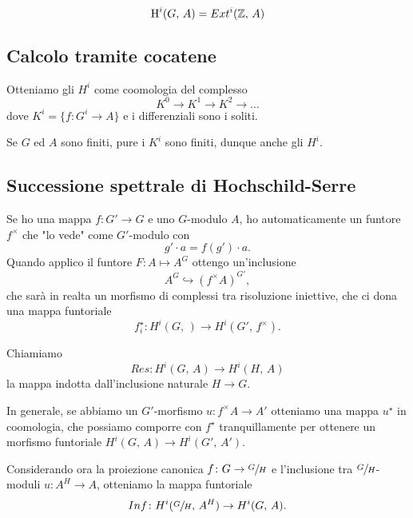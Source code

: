 \documentclass[a4paper]{article}
\begin{document}
	\begin{theorem}
		\[ \operatorname{H}^i(G, \, A) = Ext^i(\mathbb{Z}, \, A) \]
	\end{theorem}

	\subsection{Calcolo tramite cocatene}
	\begin{theorem}
		Otteniamo gli $ H^i $ come coomologia del complesso
		\[ K^0 \to K^1 \to K^2 \to \dots \]
		dove $ K^i = \{ f \colon G^i \to A \} $ e i differenziali sono i soliti.
	\end{theorem}

	\begin{theorem}
		Se $ G $ ed $ A $ sono finiti, pure i $ K^i $ sono finiti, dunque anche gli $ H^i. $
	\end{theorem}
	
	\subsection{Successione spettrale di Hochschild-Serre}
	Se ho una mappa $ f \colon G' \to G $ e uno $ G $-modulo $ A $, ho automaticamente un funtore $ f^\times $ che "lo vede" come $ G' $-modulo con
	\[ g' \cdot a = f(g') \cdot a. \]
	Quando applico il funtore $ F \colon A \mapsto A^G $ ottengo un'inclusione
	\[ A^G \hookrightarrow (f^\times A)^{G'}, \]
	che sarà in realta un morfismo di complessi tra risoluzione iniettive, che ci dona una mappa funtoriale $$  f_i^\star \colon H^i(G, \, ) \to H^i(G', \, f^\times ).  $$
	
	\begin{definition}[Restrizione]
		Chiamiamo $$  Res \colon H^i(G, \, A) \to H^i(H, \, A)  $$ la mappa indotta dall'inclusione naturale $ H \to G $.
	\end{definition}

	In generale, se abbiamo un $ G' $-morfismo $ u \colon f^\times A \to A'  $ otteniamo una mappa $ u^\star $ in coomologia, che possiamo comporre con $ f^\star $ tranquillamente per ottenere un morfismo funtoriale $ H^i(G, \, A) \to H^i(G', \, A') $.
	
	\begin{definition}[Inflazione]
		Considerando ora la proiezione canonica $ f \colon G \to \sfrac{G}{H} $ e l'inclusione tra $ \sfrac{G}{H} $-moduli $ u \colon A^H \to A $, otteniamo la mappa funtoriale \[ Inf \colon H^i(\sfrac{G}{H}, \, A^H) \to H^i(G, \, A). \]
	\end{definition}
	
\end{document}
